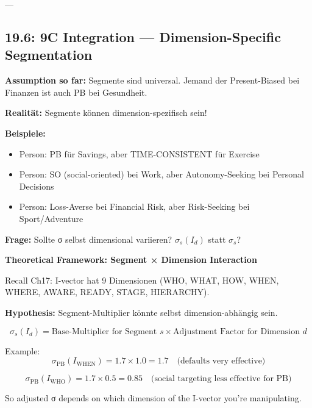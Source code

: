 ---

\subsection{19.6: 9C Integration — Dimension-Specific Segmentation}
\label{subsec:19-9c-integration}

\begin{tcolorbox}[colback=orange!5!white, colframe=orange!75!black, title=\textbf{Problem: Universal vs. Dimensional Segmentation}]

\textbf{Assumption so far:} Segmente sind universal. Jemand der Present-Biased bei Finanzen ist auch PB bei Gesundheit.

\textbf{Realität:} Segmente können dimension-spezifisch sein!

\textbf{Beispiele:}
\begin{itemize}[nosep]
\item Person: PB für Savings, aber TIME-CONSISTENT für Exercise
\item Person: SO (social-oriented) bei Work, aber Autonomy-Seeking bei Personal Decisions
\item Person: Loss-Averse bei Financial Risk, aber Risk-Seeking bei Sport/Adventure
\end{itemize}

\textbf{Frage:} Sollte σ selbst dimensional variieren? $\sigma_s(I_d)$ statt $\sigma_s$?

\end{tcolorbox}

\textbf{Theoretical Framework: Segment × Dimension Interaction}

Recall Ch17: I-vector hat 9 Dimensionen (WHO, WHAT, HOW, WHEN, WHERE, AWARE, READY, STAGE, HIERARCHY).

\textbf{Hypothesis:} Segment-Multiplier könnte selbst dimension-abhängig sein.

\begin{definition}
\label{def:19-sigma-dimensional}

\begin{equation}
\sigma_s(I_d) = \text{Base-Multiplier for Segment } s \times \text{Adjustment Factor for Dimension } d
\label{eq:19-sigma-dimensional}
\end{equation}

Example:
\begin{equation}
\sigma_{\text{PB}}(I_{\text{WHEN}}) = 1.7 \times 1.0 = 1.7 \quad \text{(defaults very effective)}
\end{equation}

\begin{equation}
\sigma_{\text{PB}}(I_{\text{WHO}}) = 1.7 \times 0.5 = 0.85 \quad \text{(social targeting less effective for PB)}
\end{equation}

So adjusted σ depends on which dimension of the I-vector you're manipulating.

\end{definition}

